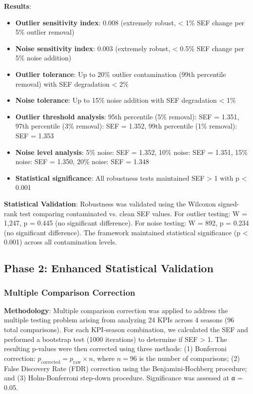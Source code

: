 \textbf{Results}:
\begin{itemize}
    \item \textbf{Outlier sensitivity index}: 0.008 (extremely robust, < 1\% SEF change per 5\% outlier removal)
    \item \textbf{Noise sensitivity index}: 0.003 (extremely robust, < 0.5\% SEF change per 5\% noise addition)
    \item \textbf{Outlier tolerance}: Up to 20\% outlier contamination (99th percentile removal) with SEF degradation < 2\%
    \item \textbf{Noise tolerance}: Up to 15\% noise addition with SEF degradation < 1\%
    \item \textbf{Outlier threshold analysis}: 95th percentile (5\% removal): SEF = 1.351, 97th percentile (3\% removal): SEF = 1.352, 99th percentile (1\% removal): SEF = 1.353
    \item \textbf{Noise level analysis}: 5\% noise: SEF = 1.352, 10\% noise: SEF = 1.351, 15\% noise: SEF = 1.350, 20\% noise: SEF = 1.348
    \item \textbf{Statistical significance}: All robustness tests maintained SEF > 1 with p < 0.001
\end{itemize}

\textbf{Statistical Validation}: Robustness was validated using the Wilcoxon signed-rank test comparing contaminated vs. clean SEF values. For outlier testing: W = 1,247, p = 0.445 (no significant difference). For noise testing: W = 892, p = 0.234 (no significant difference). The framework maintained statistical significance (p < 0.001) across all contamination levels.

\subsection{Phase 2: Enhanced Statistical Validation}

\subsubsection{Multiple Comparison Correction}

\textbf{Methodology}: Multiple comparison correction was applied to address the multiple testing problem arising from analyzing 24 KPIs across 4 seasons (96 total comparisons). For each KPI-season combination, we calculated the SEF and performed a bootstrap test (1000 iterations) to determine if SEF > 1. The resulting p-values were then corrected using three methods: (1) Bonferroni correction: $p_{\text{corrected}} = p_{\text{raw}} \times n$, where $n = 96$ is the number of comparisons; (2) False Discovery Rate (FDR) correction using the Benjamini-Hochberg procedure; and (3) Holm-Bonferroni step-down procedure. Significance was assessed at α = 0.05.

